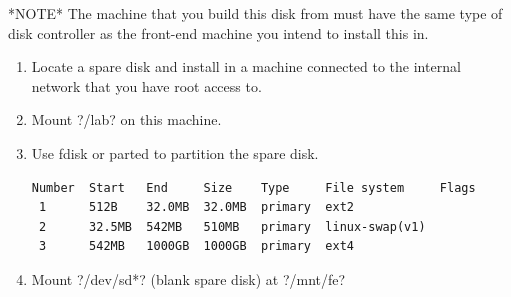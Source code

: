 *NOTE* The machine that you build this disk from must have the same type of disk controller as the front-end machine you intend to install this in.

\begin{enumerate}
    \item Locate a spare disk and install in a machine connected to the internal network that you have root access to.
    \item Mount \lstin?/lab? on this machine.
    \item Use fdisk or parted to partition the spare disk.
\begin{lstlisting}
Number  Start   End     Size    Type     File system     Flags
 1      512B    32.0MB  32.0MB  primary  ext2
 2      32.5MB  542MB   510MB   primary  linux-swap(v1)
 3      542MB   1000GB  1000GB  primary  ext4
\end{lstlisting}
    \item Mount \lstin?/dev/sd*? (blank spare disk) at \lstin?/mnt/fe?
\end{enumerate}

